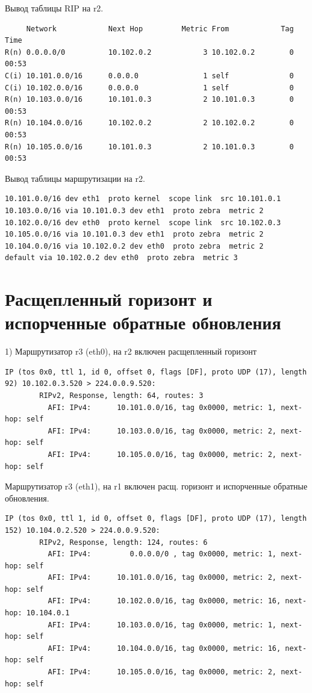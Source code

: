 \documentclass[a4paper,12pt]{article}
\begin{document}
Вывод таблицы RIP на r2.

\begin{Verbatim}
     Network            Next Hop         Metric From            Tag Time
R(n) 0.0.0.0/0          10.102.0.2            3 10.102.0.2        0 00:53
C(i) 10.101.0.0/16      0.0.0.0               1 self              0
C(i) 10.102.0.0/16      0.0.0.0               1 self              0
R(n) 10.103.0.0/16      10.101.0.3            2 10.101.0.3        0 00:53
R(n) 10.104.0.0/16      10.102.0.2            2 10.102.0.2        0 00:53
R(n) 10.105.0.0/16      10.101.0.3            2 10.101.0.3        0 00:53
\end{Verbatim}

Вывод таблицы маршрутизации на r2.

\begin{Verbatim}
10.101.0.0/16 dev eth1  proto kernel  scope link  src 10.101.0.1 
10.103.0.0/16 via 10.101.0.3 dev eth1  proto zebra  metric 2 
10.102.0.0/16 dev eth0  proto kernel  scope link  src 10.102.0.3 
10.105.0.0/16 via 10.101.0.3 dev eth1  proto zebra  metric 2 
10.104.0.0/16 via 10.102.0.2 dev eth0  proto zebra  metric 2 
default via 10.102.0.2 dev eth0  proto zebra  metric 3 
\end{Verbatim}

\section{Расщепленный горизонт и испорченные обратные обновления}

1) Маршрутизатор r3 (eth0), на r2 включен расщепленный горизонт

\begin{Verbatim}
IP (tos 0x0, ttl 1, id 0, offset 0, flags [DF], proto UDP (17), length 92) 10.102.0.3.520 > 224.0.0.9.520: 
        RIPv2, Response, length: 64, routes: 3
          AFI: IPv4:      10.101.0.0/16, tag 0x0000, metric: 1, next-hop: self
          AFI: IPv4:      10.103.0.0/16, tag 0x0000, metric: 2, next-hop: self
          AFI: IPv4:      10.105.0.0/16, tag 0x0000, metric: 2, next-hop: self
\end{Verbatim}


Маршрутизатор r3 (eth1), на r1 включен расщ. горизонт и испорченные обратные обновления.

\begin{Verbatim}
IP (tos 0x0, ttl 1, id 0, offset 0, flags [DF], proto UDP (17), length 152) 10.104.0.2.520 > 224.0.0.9.520: 
        RIPv2, Response, length: 124, routes: 6
          AFI: IPv4:         0.0.0.0/0 , tag 0x0000, metric: 1, next-hop: self
          AFI: IPv4:      10.101.0.0/16, tag 0x0000, metric: 2, next-hop: self
          AFI: IPv4:      10.102.0.0/16, tag 0x0000, metric: 16, next-hop: 10.104.0.1
          AFI: IPv4:      10.103.0.0/16, tag 0x0000, metric: 1, next-hop: self
          AFI: IPv4:      10.104.0.0/16, tag 0x0000, metric: 16, next-hop: self
          AFI: IPv4:      10.105.0.0/16, tag 0x0000, metric: 2, next-hop: self
\end{Verbatim}
\end{document}
